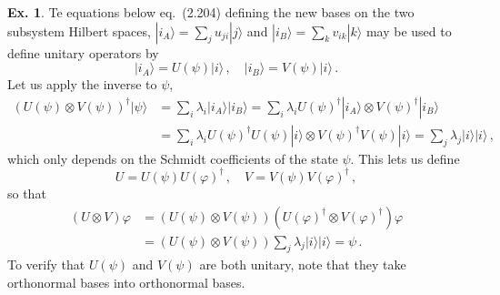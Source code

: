 \documentclass[a4paper,12pt]{article}
\theoremstyle{definition}
\newtheorem{exercise}{Ex.}[section]
\begin{document}
\begin{exercise}
Te equations below eq.\ (2.204) defining the new bases on the two subsystem Hilbert spaces, $|i_A\rangle = \sum_j u_{ji} |j\rangle$ and $|i_B\rangle = \sum_k v_{ik}|k\rangle$ may be used to define 
 unitary operators by
 \[
  |i_A\rangle = U(\psi)|i\rangle\,,\quad |i_B\rangle = V(\psi)|i\rangle\,.
 \]
 Let us apply the inverse to $\psi$,
 \[
  \begin{aligned}
   (U(\psi)\otimes V(\psi))^\dagger |\psi\rangle &= \sum_i \lambda_{i} |i_A\rangle |i_B\rangle = \sum_i \lambda_i U(\psi)^\dagger|i_A\rangle \otimes V(\psi)^\dagger |i_B\rangle\\ &= \sum_i \lambda_i U(\psi)^\dagger U(\psi)|i\rangle \otimes V(\psi)^\dagger V(\psi)|i\rangle = \sum_j \lambda_j |i\rangle|i\rangle\,,
  \end{aligned}
 \]
 which only depends on the Schmidt coefficients of the state $\psi$. This lets us define
 \[
  U = U(\psi)U(\varphi)^\dagger\,,\quad V = V(\psi)V(\varphi)^\dagger\,,
 \]
 so that
 \[
  \begin{aligned}
   (U\otimes V)\varphi &= (U(\psi)\otimes V(\psi))(U(\varphi)^\dagger\otimes V(\varphi)^\dagger)\varphi\\
   &= (U(\psi)\otimes V(\psi)) \sum_j \lambda_j |i\rangle|i\rangle = \psi\,.
  \end{aligned}
 \]
 To verify that $U(\psi)$ and $V(\psi)$ are both unitary, note that they take orthonormal bases into orthonormal bases.
\end{exercise}
\end{document}
